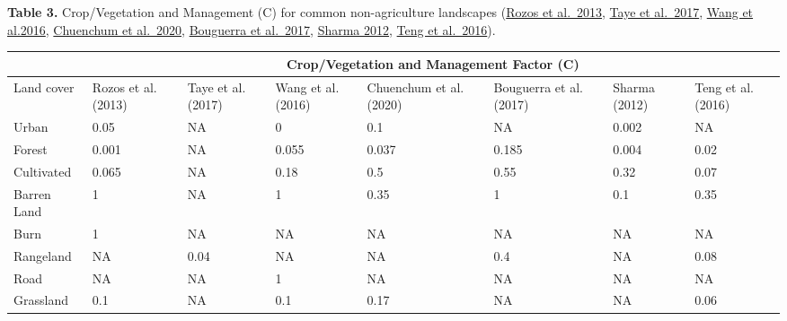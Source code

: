 \documentclass[
]{article}
\begin{document}
\textbf{Table 3.} Crop/Vegetation and Management (C) for common non-agriculture landscapes (\href{https://www.researchgate.net/publication/235988636_Application_of_the_revised_universal_soil_loss_equation_model_on_landslide_prevention_An_example_from_N_Euboea_Evia_Island_Greece}{Rozos et al.~2013}, \href{https://onlinelibrary.wiley.com/doi/epdf/10.1002/ldr.2814}{Taye et al.~2017}, \href{https://www.researchgate.net/publication/299525502_Integrated_Use_of_GCM_RS_and_GIS_for_the_Assessment_of_Hillslope_and_Gully_Erosion_in_the_Mushi_River_Sub-Catchment_Northeast_China}{Wang et al.2016}, \href{https://www.researchgate.net/publication/338289885_Estimation_of_Soil_Erosion_and_Sediment_Yield_in_the_Lancang-Mekong_River_Using_the_Modified_Revised_Universal_Soil_Loss_Equation_and_GIS_Techniques}{Chuenchum et al.~2020}, \href{https://www.researchgate.net/publication/315768765_Mapping_erosion_prone_areas_in_the_Bouhamdane_watershed_Algeria_using_the_Revised_Universal_Soil_Loss_Equation_through_GIS}{Bouguerra et al.~2017}, \href{https://www.researchgate.net/publication/334635031_Effect_of_Cell_Size_of_Digital_Elevation_Model_on_Soil_Loss_prediction_in_Maithon_Catchment}{Sharma 2012}, \href{https://www.researchgate.net/publication/288059143_Assimilating_satellite_imagery_and_visible-near_infrared_spectroscopy_to_model_and_map_soil_loss_by_water_erosion_in_Australia}{Teng et al.~2016}).

\begin{table}
\centering
\begin{tabular}[t]{>{\raggedright\arraybackslash}p{2cm}||l|l|l|l|l|l|l}
\hline
\multicolumn{1}{c|}{ } & \multicolumn{7}{c}{Crop/Vegetation and Management Factor (C)} \\
\cline{2-8}
Land cover & Rozos et al. (2013) & Taye et al.(2017) & Wang et al.(2016) & Chuenchum et al. (2020) & Bouguerra et al. (2017) & Sharma (2012) & Teng et al. (2016)\\
\hline
Urban & 0.05 & NA & 0 & 0.1 & NA & 0.002 & NA\\
\hline
Forest & 0.001 & NA & 0.055 & 0.037 & 0.185 & 0.004 & 0.02\\
\hline
Cultivated & 0.065 & NA & 0.18 & 0.5 & 0.55 & 0.32 & 0.07\\
\hline
Barren Land & 1 & NA & 1 & 0.35 & 1 & 0.1 & 0.35\\
\hline
Burn & 1 & NA & NA & NA & NA & NA & NA\\
\hline
Rangeland & NA & 0.04 & NA & NA & 0.4 & NA & 0.08\\
\hline
Road & NA & NA & 1 & NA & NA & NA & NA\\
\hline
Grassland & 0.1 & NA & 0.1 & 0.17 & NA & NA & 0.06\\
\hline
\end{tabular}
\end{table}
\end{document}
